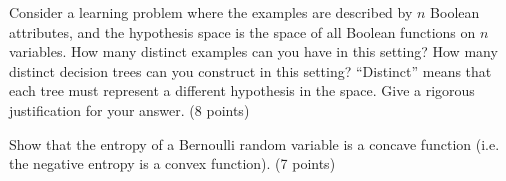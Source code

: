 \documentclass[fleqn]{homework}
\begin{document}
  \begin{problem}{4}
    \begin{question}
      Consider a learning problem where the examples are described by $n$
      Boolean attributes, and the hypothesis space is the space of all Boolean
      functions on $n$ variables.  How many distinct examples can you have in
      this setting?  How many distinct decision trees can you construct in this
      setting?  ``Distinct'' means that each tree must represent a different
      hypothesis in the space.  Give a rigorous justification for your
      answer. (8 points)
    \end{question}
  \end{problem}

  \begin{problem}{5}
    \begin{question}
      Show that the entropy of a Bernoulli random variable is a concave function
      (i.e. the negative entropy is a convex function). (7 points)
    \end{question}
  \end{problem}
\end{document}
